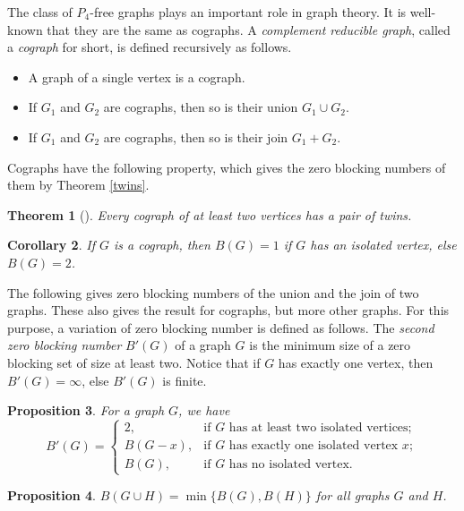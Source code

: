\documentclass[preprint,12pt]{elsarticle}
\newtheorem{theorem}{Theorem}
\newtheorem{proposition}[theorem]{Proposition}
\newtheorem{corollary}[theorem]{Corollary}
\begin{document}
{The class of $P_4$-free graphs plays an important role in graph theory.
It is well-known that they are the same as cographs.
A {\em complement reducible graph}, called a {\em cograph} for short,
is defined recursively as follows.
\begin{itemize}
\item[(C1)] A graph of a single vertex is a cograph.
\item[(CU)] If $G_1$ and $G_2$ are cographs, then so is their union $G_1\cup G_2$.
\item[(CJ)] If $G_1$ and $G_2$ are cographs, then so is their join $G_1+G_2$.
\end{itemize}
Cographs have the following property, which gives the zero blocking numbers of them by Theorem \ref{twins}.

\begin{theorem}[\cite{1981cLs}]
Every cograph of at least two vertices has a pair of twins.
\end{theorem}

\begin{corollary} \label{cograph}
If $G$ is a cograph,  then $B(G)=1$ if $G$ has an isolated vertex, else $B(G)=2$.
\end{corollary}

The following gives zero blocking numbers of the union and the join of two graphs.
These also gives the result for cographs, but more other graphs.
For this purpose, a variation of zero blocking number is defined as follows.
The {\em second zero blocking number} $B'(G)$ of a graph $G$ is the minimum size of a zero blocking set of size at least two.
Notice that if $G$ has exactly one vertex, then $B'(G)=\infty$, else $B'(G)$ is finite.

\begin{proposition}\label{2nd}
For a graph $G$, we have 
$$
B'(G)=\left\{\begin{array}{ll}
         2,      & \mbox{if $G$ has at least two isolated vertices}; \\
         B(G-x), & \mbox{if $G$ has exactly one isolated vertex $x$}; \\
         B(G),   & \mbox{if $G$ has no isolated vertex}.
             \end{array}
       \right.
$$ 
\end{proposition}


\begin{proposition}
$B(G\cup H)=\min\{B(G),B(H)\}$ for all graphs $G$ and $H$.
\end{proposition}

}
\end{document}
